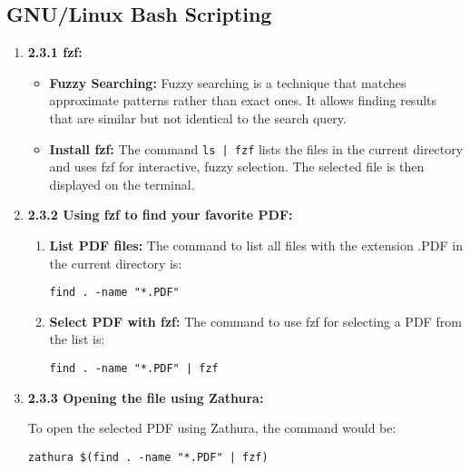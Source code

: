 \documentclass{article}
\begin{document}
\subsection{GNU/Linux Bash Scripting}
\begin{enumerate}
    \item \textbf{2.3.1 fzf:}
    
    \begin{itemize}
        \item \textbf{Fuzzy Searching:} Fuzzy searching is a technique that matches approximate patterns rather than exact ones. It allows finding results that are similar but not identical to the search query.

        \item \textbf{Install fzf:} The command \texttt{ls | fzf} lists the files in the current directory and uses fzf for interactive, fuzzy selection. The selected file is then displayed on the terminal.
    \end{itemize}

    \item \textbf{2.3.2 Using fzf to find your favorite PDF:}
    
    \begin{enumerate}
        \item \textbf{List PDF files:} The command to list all files with the extension .PDF in the current directory is:
        
        \texttt{find . -name "*.PDF"}

        \item \textbf{Select PDF with fzf:} The command to use fzf for selecting a PDF from the list is:
        
        \texttt{find . -name "*.PDF" | fzf}
    \end{enumerate}

    \item \textbf{2.3.3 Opening the file using Zathura:}

    To open the selected PDF using Zathura, the command would be:

    \texttt{zathura \$(find . -name "*.PDF" | fzf)}
    

\end{enumerate}
\end{document}
